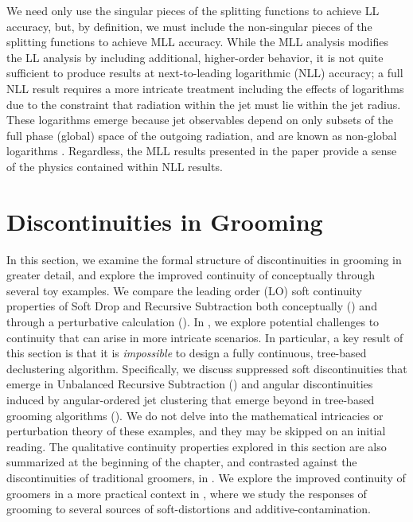 We need only use the singular pieces of the splitting functions to achieve LL accuracy, but, by definition, we must include the non-singular pieces of the splitting functions to achieve MLL accuracy.
%
While the MLL analysis modifies the LL analysis by including additional, higher-order behavior, it is not quite sufficient to produce results at next-to-leading logarithmic (NLL) accuracy;
%
a full NLL result requires a more intricate treatment including the effects of logarithms due to the constraint that radiation within the jet must lie within the jet radius.
%
These logarithms emerge because jet observables depend on only subsets of the full phase (global) space of the outgoing radiation, and are known as non-global logarithms \cite{Dasgupta:2001sh,Dasgupta:2002dc,Dasgupta:2002bw,Banfi:2002hw,Appleby:2002ke,Weigert:2003mm,Rubin:2010fc,Banfi:2010pa,Kelley:2011tj,Hornig:2011iu,Kelley:2011aa,Hatta:2013iba,Schwartz:2014wha,Khelifa-Kerfa:2015mma,Larkoski:2015zka,Larkoski:2016zzc,Banfi:2021owj}.
%
Regardless, the MLL results presented in the paper provide a sense of the physics contained within NLL results.



\section{Discontinuities in Grooming}
\label{sec:discontinuity}

In this section, we examine the formal structure of discontinuities in grooming in greater detail, and explore the improved continuity of \PIRANHA{} conceptually through several toy examples.
%
We compare the leading order (LO) soft continuity properties of Soft Drop and Recursive Subtraction both conceptually () and through a perturbative calculation ().
%
In , we explore potential challenges to continuity that can arise in more intricate scenarios.
%
In particular, a key result of this section is that it is \textit{impossible} to design a fully continuous, tree-based \gls{declustering} algorithm.
%
Specifically, we discuss suppressed soft discontinuities that emerge in Unbalanced Recursive Subtraction () and angular discontinuities induced by angular-ordered jet clustering that emerge beyond  in tree-based grooming algorithms ().
%
We do not delve into the mathematical intricacies or perturbation theory of these examples, and they may be skipped on an initial reading.
%
The qualitative continuity properties explored in this section are also summarized at the beginning of the chapter, and contrasted against the discontinuities of traditional groomers, in .
%
We explore the improved continuity of \PIRANHA{} groomers in a more practical context in , where we study the responses of \PIRANHA{} grooming to several sources of \glspl{soft-distortion} and \gls{additive-contamination}.


